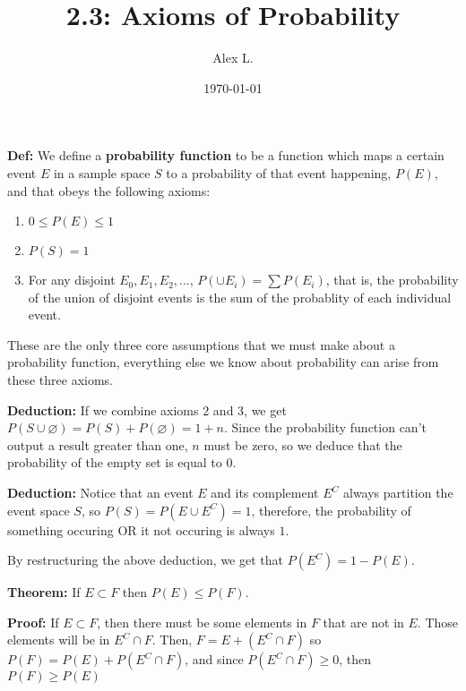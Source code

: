 \documentclass{article}
\title{2.3: Axioms of Probability}
\author{Alex L.}
\date{\today}
\begin{document}
\maketitle

\textbf{Def:} We define a \textbf{probability function} to be a function which maps a certain event $E$ in a sample space $S$ to a probability of that event happening, $P(E)$, and that obeys the following axioms:
\begin{enumerate}
    \item $0\leq P(E) \leq 1$
    \item $P(S) = 1$
    \item For any disjoint $E_0, E_1, E_2, ...$, $P(\cup E_i) = \sum P(E_i)$, that is, the probability of the union of disjoint events is the sum of the probablity of each individual event.
\end{enumerate}

These are the only three core assumptions that we must make about a probability function, everything else we know about probability can arise from these three axioms. 

\textbf{Deduction:} If we combine axioms $2$ and $3$, we get $P(S \cup \varnothing) = P(S) + P(\varnothing) = 1 + n$. Since the probability function can't output a result greater than one, $n$ must be zero, so we deduce that the probability of the empty set is equal to $0$.

\textbf{Deduction:} Notice that an event $E$ and its complement $E^C$ always partition the event space $S$, so $P(S) = P(E \cup E^C) = 1$, therefore, the probability of something occuring OR it not occuring is always $1$. 

By restructuring the above deduction, we get that $P(E^C) = 1- P(E)$.

\textbf{Theorem:} If $E \subset F$ then $P(E) \leq P(F)$. 

\textbf{Proof:} If $E \subset F$, then there must be some elements in $F$ that are not in $E$. Those elements will be in $E^C \cap F$. Then, $F = E + (E^C \cap F)$ so $P(F) = P(E) + P(E^C \cap F)$, and since $P(E^C \cap F) \geq 0$, then $P(F) \geq P(E)$
\end{document}
